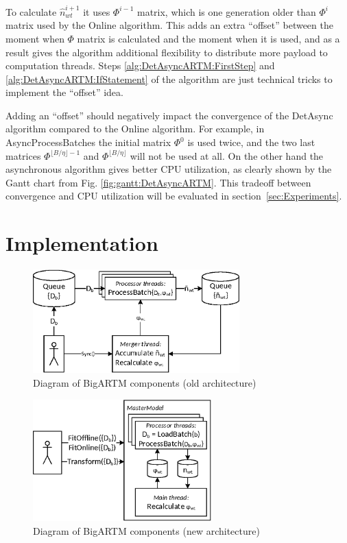 \documentclass[russian,english]{llncs}
\newcommand{\kw}[1]{\mbox{\textsf{#1}}}
\begin{document}
To calculate $\hat n^{i+1}_{wt}$ it uses $\Phi^{i-1}$ matrix,
which is one generation older than $\Phi^{i}$ matrix used by the \kw{Online} algorithm.
This adds an extra ``offset'' between the moment when $\Phi$ matrix is calculated and the moment when it is used,
and as a result gives the algorithm additional flexibility to distribute more payload to computation threads.
Steps \ref{alg:DetAsyncARTM:FirstStep} and \ref{alg:DetAsyncARTM:IfStatement} of the algorithm
are just technical tricks to implement the ``offset'' idea.

Adding an ``offset'' should negatively impact the convergence of the \kw{DetAsync} algorithm
compared to the \kw{Online} algorithm.
For example, in \kw{AsyncProcessBatches} the initial matrix $\Phi^0$ is used twice,
and the two last matrices $\Phi^{\lfloor B / \eta \rfloor - 1}$ and $\Phi^{\lfloor B / \eta \rfloor}$ will not be used at all.
On the other hand the asynchronous algorithm gives better CPU utilization,
as clearly shown by the Gantt chart from Fig. \ref{fig:gantt:DetAsyncARTM}.
This tradeoff between convergence and CPU utilization will be evaluated in section~\ref{sec:Experiments}.

\section{Implementation}
\label{sec:Architecture}

\begin{figure}[t]
	\begin{centering}
		\includegraphics[height=40mm]{diagramm_artm_core.eps}
		\caption{Diagram of BigARTM components (old architecture)}
		\label{fig:diagramm_artm_core}
	\end{centering}
\end{figure}
\begin{figure}[t]
	\begin{centering}
		\includegraphics[height=47mm]{diagramm_artm_core_v07.eps}
		\caption{Diagram of BigARTM components (new architecture)}
		\label{fig:diagramm_artm_core_v07}
	\end{centering}
\end{figure}
\end{document}

